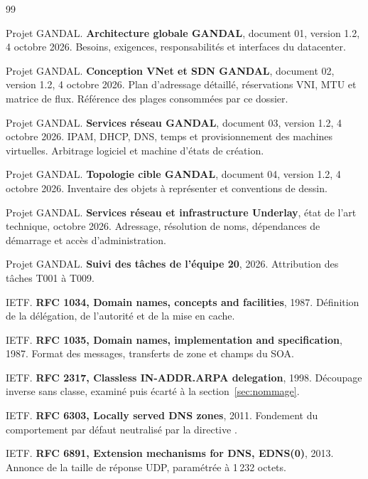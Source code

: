\cleardoublepage
{}
{}

\begin{thebibliography}{99}
\small

 Projet GANDAL. \textbf{Architecture globale GANDAL}, document
  01, version 1.2, 4 octobre 2026. Besoins, exigences, responsabilités et
  interfaces du datacenter.

 Projet GANDAL. \textbf{Conception VNet et SDN GANDAL}, document
  02, version 1.2, 4 octobre 2026. Plan d'adressage détaillé, réservations VNI,
  MTU et matrice de flux. Référence des plages consommées par ce dossier.

 Projet GANDAL. \textbf{Services réseau GANDAL}, document 03,
  version 1.2, 4 octobre 2026. IPAM, DHCP, DNS, temps et provisionnement des
  machines virtuelles. Arbitrage logiciel et machine d'états de création.

 Projet GANDAL. \textbf{Topologie cible GANDAL}, document 04,
  version 1.2, 4 octobre 2026. Inventaire des objets à représenter et
  conventions de dessin.

 Projet GANDAL. \textbf{Services réseau et infrastructure
  Underlay}, état de l'art technique, octobre 2026. Adressage, résolution de
  noms, dépendances de démarrage et accès d'administration.

 Projet GANDAL. \textbf{Suivi des tâches de l'équipe 20}, 2026.
  Attribution des tâches T001 à T009.

 IETF. \textbf{RFC 1034, Domain names, concepts and
  facilities}, 1987. Définition de la délégation, de l'autorité et de la mise en
  cache.

 IETF. \textbf{RFC 1035, Domain names, implementation and
  specification}, 1987. Format des messages, transferts de zone et champs du
  SOA.

 IETF. \textbf{RFC 2317, Classless IN-ADDR.ARPA delegation},
  1998. Découpage inverse sans classe, examiné puis écarté à la
  section~\ref{sec:nommage}.

 IETF. \textbf{RFC 6303, Locally served DNS zones}, 2011.
  Fondement du comportement par défaut neutralisé par la directive
  .

 IETF. \textbf{RFC 6891, Extension mechanisms for DNS,
  EDNS(0)}, 2013. Annonce de la taille de réponse UDP, paramétrée à 1\,232
  octets.


\end{thebibliography}
